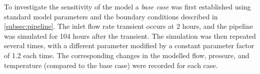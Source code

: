 To investigate the sensitivity of the model a \emph{base case} was first established using standard model parameters and the boundary conditions described in \cref{subsec:pipeline}. The inlet flow rate transient occurs at 2 hours, and the pipeline was simulated for 104 hours after the transient.
%
The simulation was then repeated several times, with a different parameter modified by a constant parameter factor of 1.2 each time. The corresponding changes in the modelled flow, pressure, and temperature (compared to the base case) were recorded for each case. 

